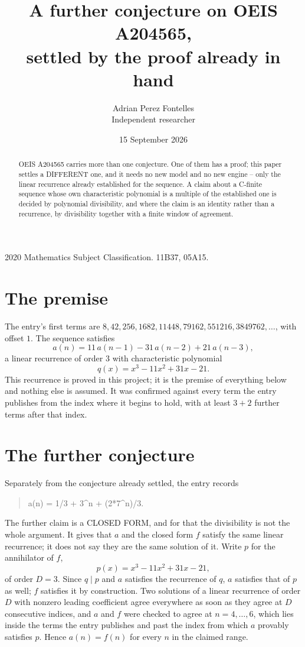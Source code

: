 \documentclass[11pt,a4paper]{article}
\title{A further conjecture on OEIS A204565,\\ \large settled by the proof already in hand}
\author{Adrian Perez Fontelles\\ \small Independent researcher}
\date{15 September 2026}
\theoremstyle{plain}
\theoremstyle{definition}
\begin{document}
\maketitle

\begin{abstract}
OEIS A204565 carries more than one conjecture. One of them has a proof; this paper settles a
DIFFERENT one, and it needs no new model and no new engine -- only the linear recurrence already
established for the sequence. A claim about a C-finite sequence whose own characteristic
polynomial is a multiple of the established one is decided by polynomial divisibility, and where
the claim is an identity rather than a recurrence, by divisibility together with a finite window
of agreement.
\end{abstract}

\noindent\small 2020 Mathematics Subject Classification. 11B37, 05A15.\normalsize

\section{The premise}

The entry's first terms are $8, 42, 256, 1682, 11448, 79162, 551216, 3849762,\dots$, with offset $1$. The sequence satisfies
\[
  a(n)=11\,a(n-1) - 31\,a(n-2) + 21\,a(n-3) ,
\]
a linear recurrence of order $3$ with characteristic polynomial
\[
  q(x)=x^{3} - 11 x^{2} + 31 x - 21 .
\]
This recurrence is proved in this project; it is the premise of everything below and nothing else is assumed.
It was confirmed against every term the entry publishes from the index where it begins to hold,
with at least $3+2$ further terms after that index.

\section{The further conjecture}

Separately from the conjecture already settled, the entry records

\begin{quote}\raggedright a(n) = 1/3 + 3\^{}n + (2*7\^{}n)/3.\end{quote}

The further claim is a CLOSED FORM, and for that the divisibility is not the whole argument. It
gives that $a$ and the closed form $f$ satisfy the same linear recurrence; it does not say they
are the same solution of it. Write $p$ for the annihilator of $f$,
\[
  p(x)=x^{3} - 11 x^{2} + 31 x - 21 ,
\]
of order $D=3$. Since $q\mid p$ and $a$ satisfies the recurrence of $q$, $a$ satisfies that of
$p$ as well; $f$ satisfies it by construction. Two solutions of a linear recurrence of order $D$
with nonzero leading coefficient agree everywhere as soon as they agree at $D$ consecutive
indices, and $a$ and $f$ were checked to agree at $n=4,\dots,6$,
which lies inside the terms the entry publishes and past the index from which $a$ provably
satisfies $p$. Hence $a(n)=f(n)$ for every $n$ in the claimed range.
\end{document}
